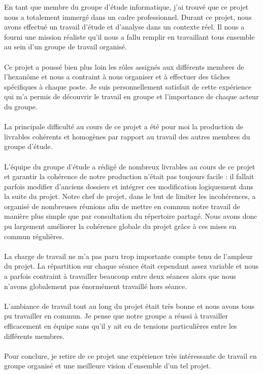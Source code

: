 En tant que membre du groupe d'étude informatique, j'ai trouvé que ce projet nous a totalement immergé dans un cadre professionnel. Durant ce projet, nous avons effectué un travail d'étude et d'analyse dans un contexte réel. Il nous a fourni une mission réaliste qu'il nous a fallu remplir en travaillant tous ensemble au sein d'un groupe de travail organisé.\\
\\
Ce projet a poussé bien plus loin les rôles assignés aux différents membres de l'hexanôme et nous a contraint à nous organiser et à effectuer des tâches spécifiques à chaque poste. Je suis personnellement satisfait de cette expérience qui m'a permis de découvrir le travail en groupe et l'importance de chaque acteur du groupe.\\
\\
La principale difficulté au cours de ce projet a été pour moi la production de livrables cohérents et homogènes par rapport au travail des autres membres du groupe d'étude.\\
\\
L'équipe du groupe d'étude a rédigé de nombreux livrables au cours de ce projet et garantir la cohérence de notre production n'était pas toujours facile : il fallait parfois modifier d'anciens dossiers et intégrer ces modification logiquement dans la suite du projet. Notre chef de projet, dans le but de limiter les incohérences, a organisé de nombreuses réunions afin de mettre en commun notre travail de manière plus simple que par consultation du répertoire partagé. Nous avons donc pu largement améliorer la cohérence globale du projet grâce à ces mises en commun régulières.\\
\\
La charge de travail ne m'a pas paru trop importante compte tenu de l'ampleur du projet. La répartition sur chaque séance était cependant assez variable et nous a parfois contraint à travailler beaucoup entre deux séances alors que nous n'avons globalement pas énormément travaillé hors séance.\\
\\
L'ambiance de travail tout au long du projet était très bonne et nous avons tous pu travailler en commun. Je pense que notre groupe a réussi à travailler efficacement en équipe sans qu'il y ait eu de tensions particulières entre les différents membres.\\
\\
Pour conclure, je retire de ce projet une expérience très intéressante de travail en groupe organisé et une meilleure vision d'ensemble d'un tel projet.


